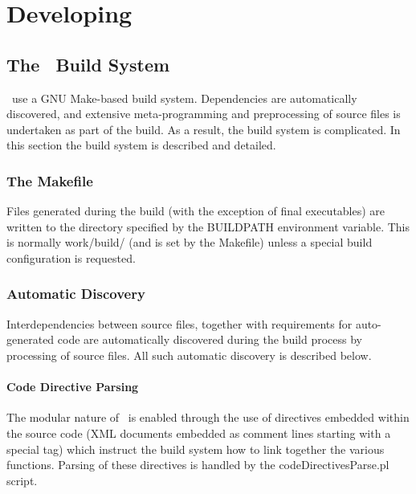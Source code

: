 \chapter{Developing \glc}

\section{The \glc\ Build System}

\glc\ use a GNU Make-based build system. Dependencies are automatically discovered, and extensive meta-programming and preprocessing of source files is undertaken as part of the build. As a result, the build system is complicated. In this section the build system is described and detailed.

\subsection{The Makefile}

Files generated during the build (with the exception of final executables) are written to the directory specified by the {\normalfont \ttfamily BUILDPATH} environment variable. This is normally {\normalfont \ttfamily work/build/} (and is set by the {\normalfont \ttfamily Makefile}) unless a special build configuration is requested.

\subsection{Automatic Discovery}

Interdependencies between source files, together with requirements for auto-generated code are automatically discovered during the build process by processing of source files. All such automatic discovery is described below.

\subsubsection{Code Directive Parsing}\label{sec:buildDiscoveryDirectives}

The modular nature of \glc\ is enabled through the use of directives embedded within the source code (XML documents embedded as comment lines starting with a special tag) which instruct the build system how to link together the various functions. Parsing of these directives is handled by the {\normalfont \ttfamily codeDirectivesParse.pl} script.


